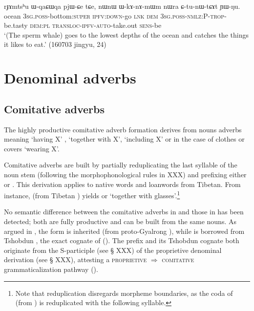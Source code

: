 \begin{exe}
\ex \label{ex:WqaCWqa}
\gll rɟɤmtsʰu ɯ-qaɕɯqa pjɯ-ɕe tɕe, nɯnɯ ɯ-kɤ-nɤ-mɯm nɯra ɕ-tu-nɯ-tɕɤt ɲɯ-ŋu. \\
ocean \textsc{3sg.poss}-bottom:\textsc{super} \textsc{ipfv}:\textsc{down}-go  \textsc{lnk} \textsc{dem} \textsc{3sg.poss}-\textsc{nmlz}:P-\textsc{trop}-be.tasty \textsc{dem:pl} \textsc{transloc-ipfv}-\textsc{auto}-take.out \textsc{sens}-be \\
\glt `(The sperm whale) goes to the lowest depths of the ocean and catches the things it likes to eat.' (160703 jingyu, 24)
\end{exe}

\section{Denominal adverbs}

\subsection{Comitative adverbs} \label{sec:comitative.adverb}
The highly productive comitative adverb formation derives from nouns adverbs meaning `having X' , `together with X', `including X' or in the case of clothes or covers `wearing X'.

Comitative adverbs are built by partially reduplicating the last syllable of the noun stem (following the morphophonological rules in XXX) and prefixing either  or . This derivation applies to native words and loanwords from Tibetan. From instance,  (from Tibetan ) yields  or  `together with glasses'.\footnote{Note that reduplication disregards morpheme boundaries, as the coda of  (from ) is reduplicated with the following syllable. } 

No semantic difference between the comitative adverbs in  and those in  has been detected; both are fully productive and can be built from the same nouns. As argued in \citet{jacques17comitative}, the  form is inherited (from proto-Gyalrong ), while  is borrowed from Tshobdun , the exact cognate of   (\citealt[107]{jackson98morphology}). The prefix  and its Tshobdun cognate  both originate from the S-participle  (see § XXX) of the proprietive  denominal derivation (see § XXX), attesting a \textsc{proprietive} $\Rightarrow$ \textsc{comitative} grammaticalization pathway  (\citealt{jacques17comitative}). 

